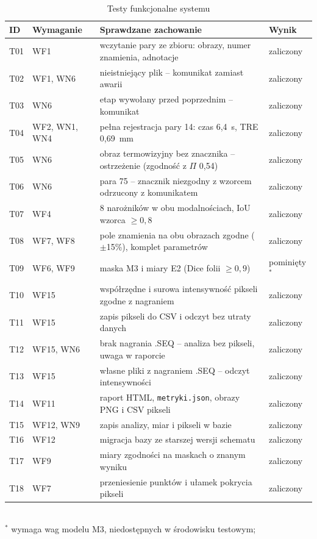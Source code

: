 \begin{table}[htbp]
  \centering
  \caption{Testy funkcjonalne systemu}
  \label{tab:testy}
  \footnotesize
  \begin{tabularx}{\textwidth}{l l X l}
    \toprule
    ID & Wymaganie & Sprawdzane zachowanie & Wynik \\
    \midrule
    T01 & WF1 & wczytanie pary ze zbioru: obrazy, numer znamienia, adnotacje & zaliczony \\
    T02 & WF1, WN6 & nieistniejący plik -- komunikat zamiast awarii & zaliczony \\
    T03 & WN6 & etap wywołany przed poprzednim -- komunikat & zaliczony \\
    T04 & WF2, WN1, WN4 & pełna rejestracja pary 14: czas 6,4~s, TRE 0,69~mm & zaliczony \\
    T05 & WN6 & obraz termowizyjny bez znacznika -- ostrzeżenie (zgodność z $\Pi$ 0,54) & zaliczony \\
    T06 & WN6 & para 75 -- znacznik niezgodny z wzorcem odrzucony z komunikatem & zaliczony \\
    T07 & WF4 & 8 narożników w obu modalnościach, IoU wzorca $\geq 0{,}8$ & zaliczony \\
    T08 & WF7, WF8 & pole znamienia na obu obrazach zgodne ($\pm$15\%), komplet parametrów & zaliczony \\
    T09 & WF6, WF9 & maska M3 i miary E2 (Dice folii $\geq 0{,}9$) & pominięty$^{*}$ \\
    T10 & WF15 & współrzędne i surowa intensywność pikseli zgodne z nagraniem & zaliczony \\
    T11 & WF15 & zapis pikseli do CSV i odczyt bez utraty danych & zaliczony \\
    T12 & WF15, WN6 & brak nagrania .SEQ -- analiza bez pikseli, uwaga w raporcie & zaliczony \\
    T13 & WF15 & własne pliki z nagraniem .SEQ -- odczyt intensywności & zaliczony \\
    T14 & WF11 & raport HTML, \texttt{metryki.json}, obrazy PNG i CSV pikseli & zaliczony \\
    T15 & WF12, WN9 & zapis analizy, miar i pikseli w bazie & zaliczony \\
    T16 & WF12 & migracja bazy ze starszej wersji schematu & zaliczony \\
    T17 & WF9 & miary zgodności na maskach o znanym wyniku & zaliczony \\
    T18 & WF7 & przeniesienie punktów i ułamek pokrycia pikseli & zaliczony \\
    \bottomrule
  \end{tabularx}
  \\[2pt]{\footnotesize $^{*}$ wymaga wag modelu M3, niedostępnych w środowisku testowym; %
}
\end{table}

